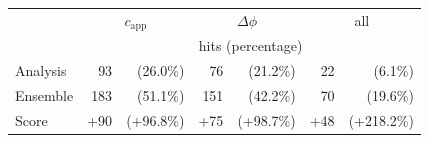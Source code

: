 \documentclass{article}
\begin{document}
\vspace{20pt plus 10pt minus 5pt}
\begin{minipage}[b]{\columnwidth}
%
\begin{center}
\begin{tabular}{l r r | r r | r r}
\hline
& \multicolumn{2}{c}{$c_{\text{app}}$} &  \multicolumn{2}{|c}{$\Delta\phi$} &  \multicolumn{2}{|c}{all} \\
\cline{2-7}
& \multicolumn{6}{c}{hits (percentage)} \\
\hline
Analysis 	& 93	&(26.0\%) & 76 & (21.2\%) &  22 & (6.1\%) \\
Ensemble & 183 &(51.1\%) & 151 & (42.2\%)  & 70 & (19.6\%) \\
Score & +90 & (+96.8\%) & +75 & (+98.7\%)  & +48 & (+218.2\%) \\
\hline
\end{tabular}
\end{center}
\label{table}
%
\end{minipage}




\pushdown








\ecols %
\end{document}
